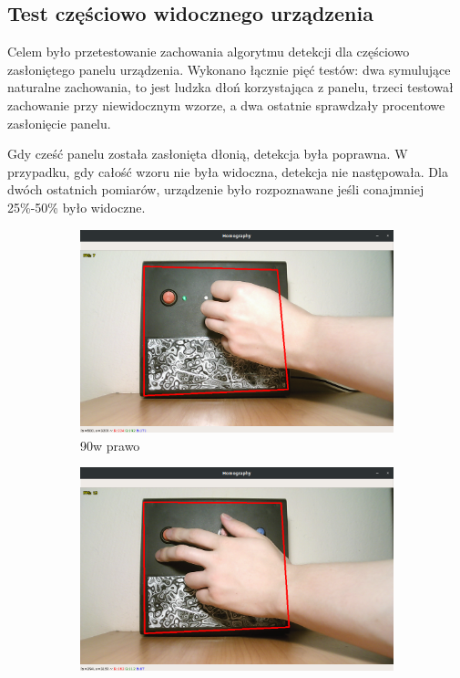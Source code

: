 \documentclass[12pt,twoside,polish]{article}
\begin{document}
\subsection{Test częściowo widocznego urządzenia}
Celem było przetestowanie zachowania algorytmu detekcji dla częściowo zasłoniętego panelu urządzenia. Wykonano łącznie pięć testów: dwa symulujące naturalne zachowania, to jest ludzka dłoń korzystająca z panelu, trzeci testował zachowanie przy niewidocznym wzorze, a dwa ostatnie sprawdzały procentowe zasłonięcie panelu.

Gdy cześć panelu została zasłonięta dłonią, detekcja była poprawna. W przypadku, gdy całość wzoru nie była widoczna, detekcja nie następowała. Dla dwóch ostatnich pomiarów, urządzenie było rozpoznawane jeśli conajmniej 25\%-50\% było widoczne.

\begin{figure}[htb!]
	\begin{subfigure}[b]{0.5\textwidth}
		\includegraphics[width=\textwidth]{test_cover1}
		\caption{90\degree w prawo}
		\label{test_cover1}
	\end{subfigure}
	\begin{subfigure}[b]{0.5\textwidth}
		\includegraphics[width=\textwidth]{test_cover2}

\end{subfigure}
\end{figure}
\end{document}
